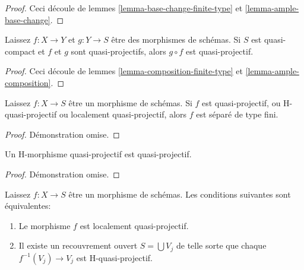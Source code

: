 \begin{proof}
Ceci découle de lemmes \ref{lemma-base-change-finite-type} et \ref{lemma-ample-base-change}.
\end{proof}

\begin{lemma}

\label{lemma-composition-quasi-projective}
Laissez $f : X \to Y$ et $g : Y \to S$ être des morphismes de schémas. Si $S$ est quasi-compact et $f$ et $g$ sont quasi-projectifs, alors $g \circ f$ est quasi-projectif.
\end{lemma}

\begin{proof}
Ceci découle de lemmes \ref{lemma-composition-finite-type} et \ref{lemma-ample-composition}.
\end{proof}

\begin{lemma}

\label{lemma-quasi-projective-properties}
Laissez $f : X \to S$ être un morphisme de schémas. Si $f$ est quasi-projectif, ou H-quasi-projectif ou localement quasi-projectif, alors $f$ est séparé de type fini.
\end{lemma}

\begin{proof}
Démonstration omise.
\end{proof}

\begin{lemma}

\label{lemma-H-quasi-projective-quasi-projective}

Un H-morphisme quasi-projectif est quasi-projectif.

\end{lemma}

\begin{proof}
Démonstration omise.
\end{proof}

\begin{lemma}

\label{lemma-characterize-locally-quasi-projective}
Laissez $f : X \to S$ être un morphisme de schémas. Les conditions suivantes sont équivalentes:
\begin{enumerate}
\item Le morphisme $f$ est localement quasi-projectif.
\item Il existe un recouvrement ouvert $S = \bigcup V_j$ de telle sorte que chaque $f^{-1}(V_j) \to V_j$ est H-quasi-projectif.
\end{enumerate}

\end{lemma}

